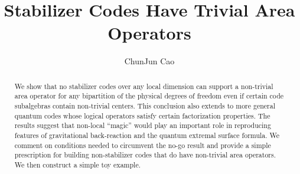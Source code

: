 \documentclass[%
 reprint,
superscriptaddress,
nofootinbib,
 amsmath,amssymb,
 aps,
prx,
floatfix,
]{revtex4-2}
\theoremstyle{definition}
\numberwithin{equation}{section}
\begin{document}
\title{Stabilizer Codes Have Trivial Area Operators}


\author{ChunJun Cao}


\begin{abstract}
We show that no stabilizer codes over any local dimension can support a non-trivial area operator for any bipartition of the physical degrees of freedom even if certain code subalgebras contain non-trivial centers. This conclusion also extends to more general quantum codes whose logical operators satisfy certain factorization properties. The results suggest that non-local ``magic'' would play an important role in reproducing features of gravitational back-reaction and the quantum extremal surface formula. 
We comment on conditions needed to circumvent the no-go result and provide a simple prescription for building non-stabilizer codes that do have non-trivial area operators. We then construct a simple toy example.
\end{abstract}


\maketitle
\end{document}
